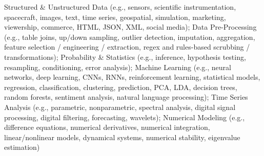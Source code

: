 Structured \& Unstructured Data (e.g., sensors,
scientific instrumentation, spacecraft, 
images, text, time series, geospatial, simulation, 
marketing, viewership, commerce, HTML, JSON, XML, social media);
Data Pre-Processing (e.g., table joins, up/down sampling, outlier 
detection, imputation, aggregation, feature selection / engineering /
extraction, regex and rules-based scrubbing / transformations);
Probability \& Statistics (e.g., inference,
hypothesis testing, resampling, conditioning, error analysis);
Machine Learning (e.g., neural networks,
deep learning, CNNs, RNNs, reinforcement learning, statistical
models, regression, classification, clustering, prediction,
PCA, LDA, decision trees, random forests, sentiment analysis,
natural language processing);
Time Series Analysis (e.g., parametric, nonparametric, spectral
analysis, digital signal processing, digital filtering, forecasting,
wavelets);
Numerical Modeling
(e.g., difference equations, numerical derivatives, numerical
integration, linear/nonlinear models, dynamical systems, numerical stability, 
eigenvalue estimation)

